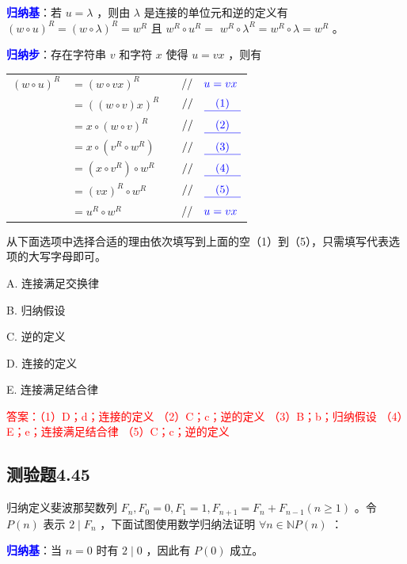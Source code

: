 \documentclass[UTF8, heading=true]{ctexart}
\begin{document}
\textcolor{blue}{\textbf{归纳基}}：若 $u=\lambda$ ，则由 $\lambda$ 是连接的单位元和逆的定义有 $(w \circ u)^R=(w \circ \lambda)^R=w^R$ 且 $w^R \circ u^R=$ $w^R \circ \lambda^R=w^R \circ \lambda=w^R$ 。

\textcolor{blue}{\textbf{归纳步}}：存在字符串 $v$ 和字符 $x$ 使得 $u=v x$ ，则有


\begin{table}[H]
  \renewcommand{\arraystretch}{1.5}
  \centering
\begin{tabular}{rlrl}
  $(w \circ u)^R$ & $=(w \circ v x)^R$ & & $/ / \quad \textcolor{blue}{u = v x}$ \\
  & $=((w \circ v) x)^R$ & & $/ / \quad \textcolor{blue}{\underline{\quad (1) \quad}}$ \\
  & $=x \circ(w \circ v)^R$ & & $/ / \quad \textcolor{blue}{\underline{\quad (2) \quad}}$ \\
  & $=x \circ\left(v^R \circ w^R\right)$ & & $/ / \quad \textcolor{blue}{\underline{\quad (3) \quad}}$ \\
  & $=\left(x \circ v^R\right) \circ w^R$ & & $/ / \quad \textcolor{blue}{\underline{\quad (4) \quad}}$ \\
  & $=(v x)^R \circ w^R$ & & $/ / \quad \textcolor{blue}{\underline{\quad (5) \quad}}$ \\
  & $=u^R \circ w^R$ & & $/ / \quad \textcolor{blue}{u = v x}$
\end{tabular}
\end{table}


从下面选项中选择合适的理由依次填写到上面的空（1）到（5），只需填写代表选项的大写字母即可。

A. 连接满足交换律

B. 归纳假设

C. 逆的定义

D. 连接的定义

E. 连接满足结合律

\textcolor{red}{答案：（1）D；d；连接的定义
（2）C；c；逆的定义
（3）B；b；归纳假设
（4）E；e；连接满足结合律
（5）C；c；逆的定义}


\subsection{测验题4.45}

归纳定义斐波那契数列 $F_n, F_0=0, F_1=1, F_{n+1}=F_n+F_{n-1}(n \geq 1)$ 。令 $P(n)$ 表示 $2 \mid F_n$ ，下面试图使用数学归纳法证明 $\forall n \in \mathbb{N} P(n)$ ：

\textcolor{blue}{\textbf{归纳基}}：当 $n=0$ 时有 $2 \mid 0$ ，因此有 $P(0)$ 成立。
\end{document}
